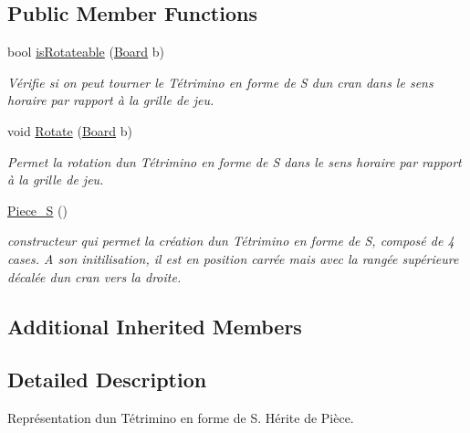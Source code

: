 \subsection*{Public Member Functions}
\begin{DoxyCompactItemize}
\item 
bool \hyperlink{classPiece__S_a725b9e7b154628e035bcc7ebd2a3ec9f}{is\+Rotateable} (\hyperlink{classBoard}{Board} b)
\begin{DoxyCompactList}\small\item\em Vérifie si on peut tourner le Tétrimino en forme de S d\textquotesingle{}un cran dans le sens horaire par rapport à la grille de jeu. \end{DoxyCompactList}\item 
void \hyperlink{classPiece__S_aefb2837f39f6b05bc678a3fdadc192b0}{Rotate} (\hyperlink{classBoard}{Board} b)
\begin{DoxyCompactList}\small\item\em Permet la rotation d\textquotesingle{}un Tétrimino en forme de S dans le sens horaire par rapport à la grille de jeu. \end{DoxyCompactList}\item 
\mbox{\label{classPiece__S_aa39b8ee3dd219a03af2c6e0b3d05be5c}} 
\hyperlink{classPiece__S_aa39b8ee3dd219a03af2c6e0b3d05be5c}{Piece\+\_\+S} ()
\begin{DoxyCompactList}\small\item\em constructeur qui permet la création d\textquotesingle{}un Tétrimino en forme de S, composé de 4 cases. A son initilisation, il est en position carrée mais avec la rangée supérieure décalée d\textquotesingle{}un cran vers la droite. \end{DoxyCompactList}\end{DoxyCompactItemize}
\subsection*{Additional Inherited Members}


\subsection{Detailed Description}
Représentation d\textquotesingle{}un Tétrimino en forme de S. Hérite de Pièce. 

